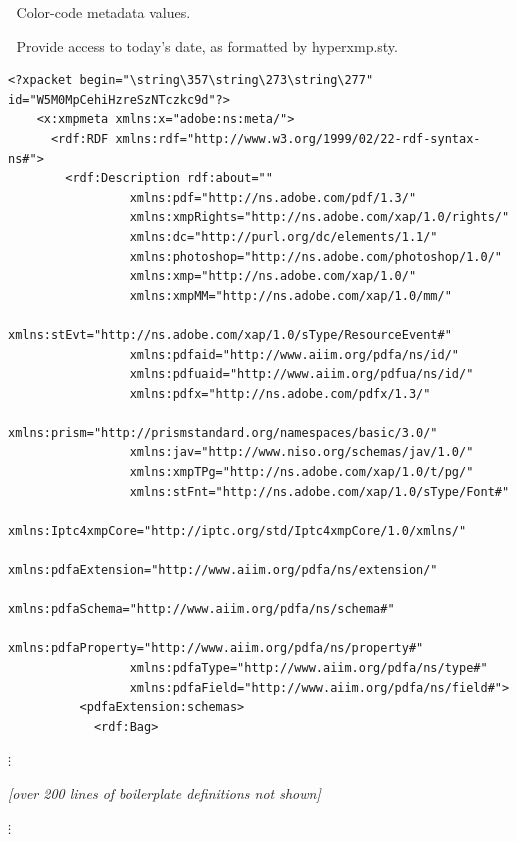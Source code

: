 ^^A  Color-code metadata values.
\newcommand{\metavalue}[1]{\textcolor{blue}{#1}}

^^A  Provide access to today's date, as formatted by hyperxmp.sty.
\makeatletter
\let\todayISO=\hyxmp@today
\makeatother

\begin{Verbatim}[fontsize=\small,commandchars=\\\{\}]
    <?xpacket begin="\string\357\string\273\string\277" id="W5M0MpCehiHzreSzNTczkc9d"?>
    <x:xmpmeta xmlns:x="adobe:ns:meta/">
      <rdf:RDF xmlns:rdf="http://www.w3.org/1999/02/22-rdf-syntax-ns#">
        <rdf:Description rdf:about=""
                 xmlns:pdf="http://ns.adobe.com/pdf/1.3/"
                 xmlns:xmpRights="http://ns.adobe.com/xap/1.0/rights/"
                 xmlns:dc="http://purl.org/dc/elements/1.1/"
                 xmlns:photoshop="http://ns.adobe.com/photoshop/1.0/"
                 xmlns:xmp="http://ns.adobe.com/xap/1.0/"
                 xmlns:xmpMM="http://ns.adobe.com/xap/1.0/mm/"
                 xmlns:stEvt="http://ns.adobe.com/xap/1.0/sType/ResourceEvent#"
                 xmlns:pdfaid="http://www.aiim.org/pdfa/ns/id/"
                 xmlns:pdfuaid="http://www.aiim.org/pdfua/ns/id/"
                 xmlns:pdfx="http://ns.adobe.com/pdfx/1.3/"
                 xmlns:prism="http://prismstandard.org/namespaces/basic/3.0/"
                 xmlns:jav="http://www.niso.org/schemas/jav/1.0/"
                 xmlns:xmpTPg="http://ns.adobe.com/xap/1.0/t/pg/"
                 xmlns:stFnt="http://ns.adobe.com/xap/1.0/sType/Font#"
                 xmlns:Iptc4xmpCore="http://iptc.org/std/Iptc4xmpCore/1.0/xmlns/"
                 xmlns:pdfaExtension="http://www.aiim.org/pdfa/ns/extension/"
                 xmlns:pdfaSchema="http://www.aiim.org/pdfa/ns/schema#"
                 xmlns:pdfaProperty="http://www.aiim.org/pdfa/ns/property#"
                 xmlns:pdfaType="http://www.aiim.org/pdfa/ns/type#"
                 xmlns:pdfaField="http://www.aiim.org/pdfa/ns/field#">
          <pdfaExtension:schemas>
            <rdf:Bag>
\end{Verbatim}
\begin{center}
  $\vdots$\par
  \emph{[over 200 lines of boilerplate definitions not shown]}\par
  $\vdots$\par
\end{center}
